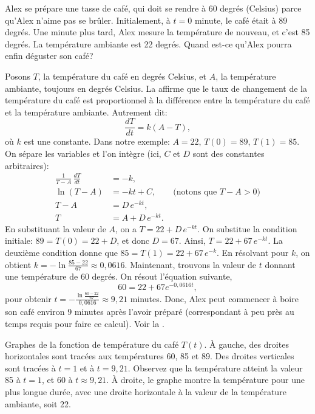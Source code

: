 \begin{example} \label{sep:coffeeexample}
	Alex se prépare une tasse de café, qui doit se rendre à 60 degrés (Celsius) parce qu'Alex n'aime pas se brûler.
	Initialement, à $t=0$ minute,
	le café était à 89 degrés.  Une minute plus tard, Alex mesure la température de nouveau, et c'est 85 degrés.
	La température ambiante est 22 degrés.  Quand est-ce qu'Alex pourra enfin déguster son café?

	Posons $T$, la température du café en degrés Celsius, et $A$, la température ambiante, toujours en degrés Celsius.
	La 	 affirme que le taux de changement de la température du café est
	proportionnel à la différence entre la température du café et la température ambiante.  Autrement dit:
	\begin{equation*}
		\frac{dT}{dt} = k(A-T),
	\end{equation*}
	où $k$ est une constante.
	Dans notre exemple: $A=22$, $T(0) = 89$, $T(1) = 85$.
	On sépare les variables et l'on intègre (ici, $C$ et $D$ sont des constantes arbitraires):
	\begin{align*}
		\frac{1}{T-A} \, \frac{dT}{dt} & = -k , \\
							\ln (T-A)  &= -kt + C , \qquad \text{(notons que } T-A > 0 \text{)} \\
								T-A    &= D\, e^{-kt} ,  \\
								T      &= A + D\, e^{-kt} .
	\end{align*}
	En substituant la valeur de $A$, on a
	$T = 22 + D\, e^{-kt}$.
	On substitue la condition initiale: $89 = T(0) = 22 + D$,
	et donc $D = 67$.
	Ainsi,  $T = 22 + 67\, e^{-kt}$.
	La deuxième condition donne que $85 = T(1) = 22 + 67\, e^{-k}$.
	En résolvant pour $k$, on obtient 	$k = - \ln \frac{85-22}{67} \approx 0{,}0616$.
	Maintenant, trouvons la valeur de $t$ donnant une température de 60 degrés.
	On résout l'équation suivante,
	\begin{equation*}
		60 = 22 + 67 e^{-0{,}0616t},
	\end{equation*}
	pour obtenir
	$t = - \frac{\ln \frac{60-22}{67}}{0{,}0616} \approx 9{,}21$ minutes.
	Donc, Alex peut commencer à boire son café environ 9 minutes après l'avoir préparé (correspondant à peu près au temps requis pour faire ce calcul).  Voir la .
	\begin{myfig}
		\capstart		{}
		\caption{Graphes de la fonction de température du café $T(t)$.
		À gauche, des droites horizontales sont tracées aux températures 60, 85 et 89.
		Des droites verticales sont tracées à $t=1$ et à $t=9{,}21$.
		Observez que la température atteint la valeur 85 à $t=1$, et 60 à
		$t \approx 9{,}21$.  À droite, le graphe montre la température pour une plus longue durée,
		avec une droite horizontale à la valeur de la température ambiante, soit 22.\label{sintro:coffeefig}}
	\end{myfig}
\end{example}

